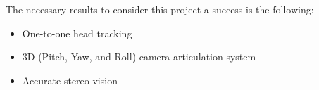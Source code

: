 The necessary results to consider this project a success is the following:

\begin{itemize}
	\item One-to-one head tracking
	\item 3D (Pitch, Yaw, and Roll) camera articulation system
	\item Accurate stereo vision
\end{itemize}